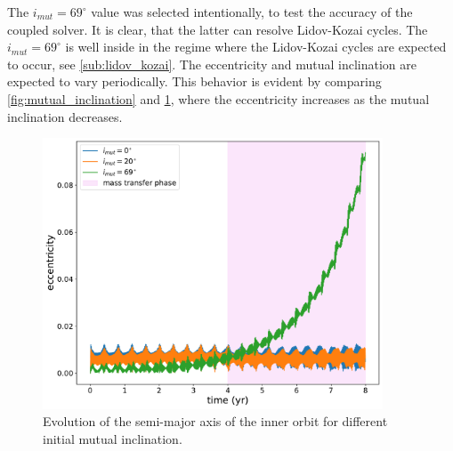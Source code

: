 The $i_{mut}=69^{\circ}$ value was selected intentionally, to test the accuracy of the coupled solver. It is clear, that the latter can resolve Lidov-Kozai cycles. The $i_{mut}=69^{\circ}$ is well inside in the regime where the Lidov-Kozai cycles are expected to occur, see \cref{sub:lidov_kozai}. The eccentricity and mutual inclination are expected to vary periodically. This behavior is evident by comparing \cref{fig:mutual_inclination} and \cref{fig:inclination_inner_ecc}, where the eccentricity increases as the mutual inclination decreases. 
\begin{figure}[!htb]
    \centering
    \includegraphics[width=0.9\textwidth]{Thesis/graphs/inclination_case/inclination_inner_ecc.pdf}
    \caption{Evolution of the semi-major axis of the inner orbit for different initial mutual inclination.}
    \label{fig:inclination_inner_ecc}
\end{figure}
